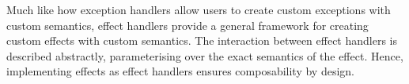 


Much like how exception handlers allow users to create custom exceptions with custom semantics, effect handlers provide a general framework for creating custom effects with custom semantics. The interaction between effect handlers is described abstractly, parameterising over the exact semantics of the effect. Hence, implementing effects as effect handlers ensures composability by design. 

